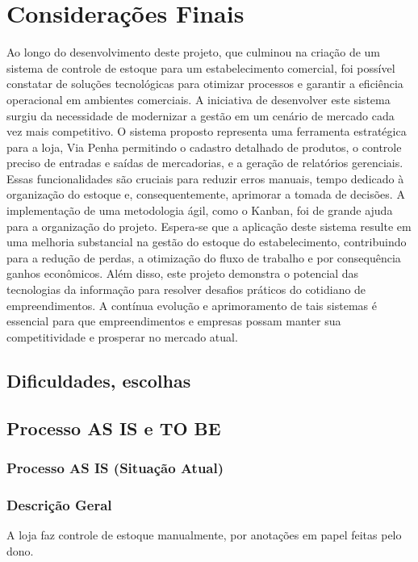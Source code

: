 \documentclass[
	12pt,				%
	openany,			%
	twoside,			%
	a4paper,			%
	english,			%
	brazil				%
	]{abntex2}
\begin{document}
\chapter{Considerações Finais}
Ao longo do desenvolvimento deste projeto, que culminou na criação de um sistema de controle de estoque para um estabelecimento comercial, foi possível constatar de soluções tecnológicas para otimizar processos e garantir a eficiência operacional em ambientes comerciais. A iniciativa de desenvolver este sistema surgiu da necessidade de modernizar a gestão  em um cenário de mercado cada vez mais competitivo.
O sistema proposto representa uma ferramenta estratégica para a loja, Via Penha permitindo o cadastro detalhado de produtos, o controle preciso de entradas e saídas de mercadorias, e a geração de relatórios gerenciais. Essas funcionalidades são cruciais para reduzir erros manuais, tempo dedicado à organização do estoque e, consequentemente, aprimorar a tomada de decisões. A implementação de uma metodologia ágil, como o Kanban, foi de grande ajuda para a organização do projeto.
Espera-se que a aplicação deste sistema resulte em uma melhoria substancial na gestão do estoque do estabelecimento, contribuindo para a redução de perdas, a otimização do fluxo de trabalho e por consequência ganhos econômicos. Além disso, este projeto demonstra o potencial das tecnologias da informação para resolver desafios práticos do cotidiano de empreendimentos. A contínua evolução e aprimoramento de tais sistemas é essencial para que empreendimentos e empresas   possam manter sua competitividade e prosperar no mercado atual.

\section{Dificuldades, escolhas}

\section{Processo AS IS e TO BE}

\subsection{Processo AS IS (Situação Atual)}

\subsection*{Descrição Geral}
A loja faz controle de estoque manualmente, por anotações em papel feitas pelo dono.
\end{document}
